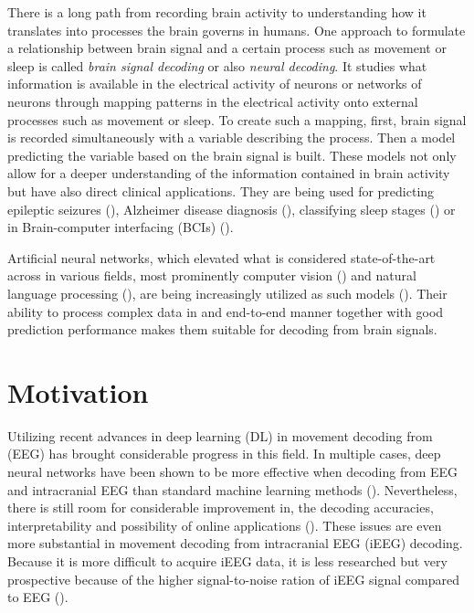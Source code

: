 There is a long path from recording brain activity to understanding how it translates into processes the brain governs in humans.
One approach to formulate a relationship between brain signal and a certain process such as movement or sleep is called \textit{brain signal decoding} or also \textit{neural decoding}.
It studies what information is available in the electrical activity of neurons or networks of neurons through mapping patterns in the electrical activity onto external processes such as movement or sleep.
To create such a mapping, first, brain signal is recorded simultaneously with a variable describing the process. 
Then a model predicting the variable based on the brain signal is built.
These models not only allow for a deeper understanding of the information contained in brain activity but have also direct clinical applications.
They are being used for predicting epileptic seizures (\cite{epileptic-seizures-eeg}), Alzheimer disease diagnosis (\cite{alzheimer-eeg}), classifying sleep stages (\cite{sleep-stage-alg-comparison}) or in Brain-computer interfacing (BCIs) (\cite{ecog-bci, eeg-bci}).

Artificial neural networks, which elevated what is considered state-of-the-art across in various fields, most prominently computer vision (\cite{dnn-computer-vision}) and natural language processing (\cite{dnn-nlp}), are being increasingly utilized as such models (\cite{Roy-2019}). 
Their ability to process complex data in and end-to-end manner together with good prediction performance makes them suitable for decoding from brain signals. 


\section*{Motivation}
Utilizing recent advances in deep learning (DL) in movement decoding from (EEG) has brought considerable progress in this field.
In multiple cases, deep neural networks have been shown to be more effective when decoding from EEG and intracranial EEG than standard machine learning methods (\cite{Zhang-2019, eeg-net, sleep-eegnet}).
Nevertheless, there is still room for considerable improvement in, the decoding accuracies, interpretability and possibility of online applications (\cite{Roy-2019}). 
These issues are even more substantial in movement decoding from intracranial EEG (iEEG) decoding. 
Because it is more difficult to acquire iEEG data, it is less researched but very prospective because of the higher signal-to-noise ration of iEEG signal compared to EEG (\cite{volkova-review}). 

